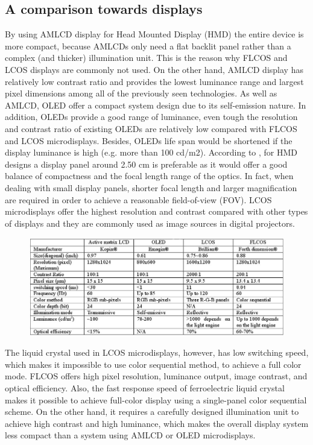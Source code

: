 \subsection{A comparison towards displays}
By using AMLCD display for Head Mounted Display (HMD) the entire 
device is more compact, because AMLCDs only need a flat backlit 
panel rather than a complex (and thicker) illumination unit. 
This is the reason why FLCOS and LCOS displays are commonly not used. 
%
On the other hand, AMLCD display has relatively low contrast ratio 
and provides the lowest luminance range and largest pixel dimensions 
among all of the previously seen technologies.
As well as AMLCD, OLED offer a compact system design due to its 
self-emission nature. In addition, OLEDs provide a good range of 
luminance, even tough the resolution and contrast ratio of 
existing OLEDs are relatively low compared with FLCOS and LCOS microdisplays.
%
Besides, OLEDs life span would be shortened if the display 
luminance is high (e.g. more than 100 cd/m2).
%
According to \cite{Zhang:08}, for HMD designs a display panel around 2.50 cm is 
preferable as it would offer a good balance of compactness and the 
focal length range of the optics. In fact, when dealing with small 
display panels, shorter focal length and larger magnification are 
required in order to achieve a reasonable field-of-view (FOV). 
%
LCOS microdisplays offer the highest resolution and contrast compared 
with other types of displays and they are commonly used as image 
sources in digital projectors. 
%

%
\begin{figure}[!h]
  \begin{center}
    \includegraphics[width=400pt]{img/hmd_comparison_table}  %
  \end{center}
\end{figure}
%

%
The liquid crystal used in LCOS microdisplays, however, has low 
switching speed, which makes it impossible to use color sequential 
method, to achieve a full color mode. FLCOS offers high pixel 
resolution, luminance output, image contrast, and optical efficiency. 
Also, the fast response speed of ferroelectric liquid crystal makes 
it possible to achieve full-color display using a single-panel color 
sequential scheme. On the other hand, it requires a carefully designed 
illumination unit to achieve high contrast and high luminance, which 
makes the overall display system less compact than a system using 
AMLCD or OLED microdisplays.
